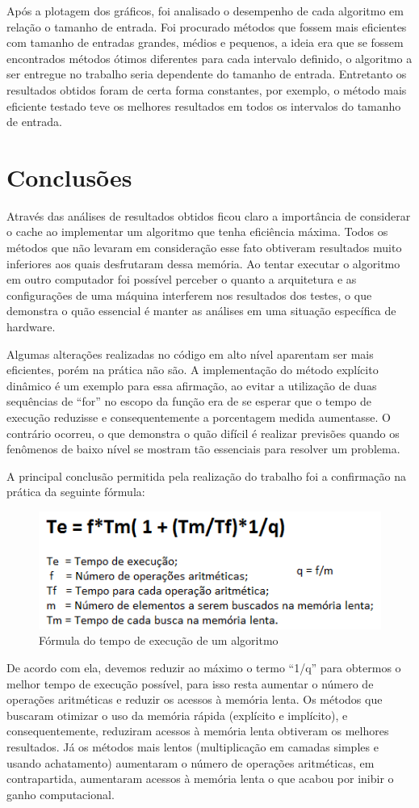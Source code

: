 \documentclass[a4paper, 10pt]{article}
\begin{document}
Após a plotagem dos gráficos, foi analisado o desempenho de cada algoritmo em relação o tamanho de entrada. Foi procurado métodos que fossem mais eficientes com tamanho de entradas grandes, médios e pequenos, a ideia era que se fossem encontrados métodos ótimos diferentes para cada intervalo definido, o algoritmo a ser entregue no trabalho seria dependente do tamanho de entrada. Entretanto os resultados obtidos foram de certa forma constantes, por exemplo, o método mais eficiente testado teve os melhores resultados em todos os intervalos do tamanho de entrada.

\section{Conclusões}
Através das análises de resultados obtidos ficou claro a importância de considerar o cache ao implementar um algoritmo que tenha eficiência máxima. Todos os métodos que não levaram em consideração esse fato obtiveram resultados muito inferiores aos quais desfrutaram dessa memória. Ao tentar executar o algoritmo em outro computador foi possível perceber o quanto a arquitetura e as configurações de uma máquina interferem nos resultados dos testes, o que demonstra o quão essencial é manter as análises em uma situação específica de hardware.

Algumas alterações realizadas no código em alto nível aparentam ser mais eficientes, porém na prática não são. A implementação do método explícito dinâmico é um exemplo para essa afirmação, ao evitar a utilização de duas sequências de “for” no escopo da função era de se esperar que o tempo de execução reduzisse e consequentemente a porcentagem medida aumentasse. O contrário ocorreu, o que demonstra o quão difícil é realizar previsões quando os fenômenos de baixo nível se mostram tão essenciais para resolver um problema.

A principal conclusão permitida pela realização do trabalho foi a confirmação na prática da seguinte fórmula:
\begin{figure}[!h]
\centering
\includegraphics[scale=0.7]{formula}
\caption{Fórmula do tempo de execução de um algoritmo}
\label{Fórmula}
\end{figure}

De acordo com ela, devemos reduzir ao máximo o termo “1/q” para obtermos o melhor tempo de execução possível, para isso resta aumentar o número de operações aritméticas e reduzir os acessos à memória lenta. Os métodos que buscaram otimizar o uso da memória rápida (explícito e implícito), e consequentemente, reduziram acessos à memória lenta obtiveram os melhores resultados. Já os métodos mais lentos (multiplicação em camadas simples e usando achatamento) aumentaram o número de operações aritméticas, em contrapartida, aumentaram acessos à memória lenta o que acabou por inibir o ganho computacional.
\end{document}
